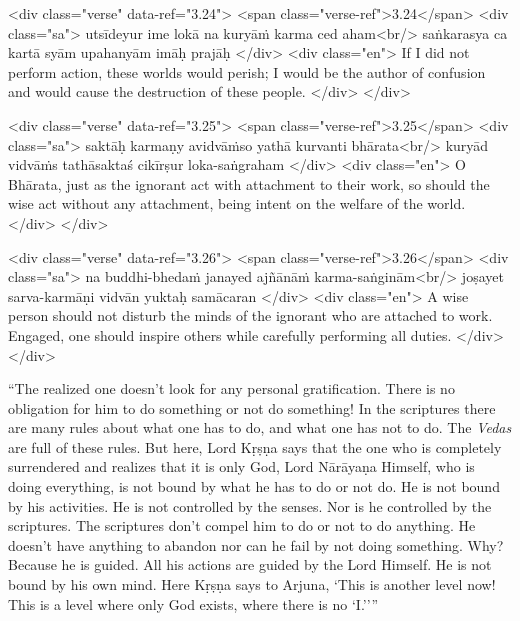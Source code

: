 \begin{html}
<div class="verse" data-ref="3.24">
  <span class="verse-ref">3.24</span>
  <div class="sa">
    utsīdeyur ime lokā na kuryāṁ karma ced aham<br/>
    saṅkarasya ca kartā syām upahanyām imāḥ prajāḥ
  </div>
  <div class="en">
    If I did not perform action, these worlds would perish; I would be the author of confusion and would cause the destruction of these people.
  </div>
</div>
\end{html}



\begin{html}
<div class="verse" data-ref="3.25">
  <span class="verse-ref">3.25</span>
  <div class="sa">
    saktāḥ karmaṇy avidvāṁso yathā kurvanti bhārata<br/>
    kuryād vidvāṁs tathāsaktaś cikīrṣur loka-saṅgraham
  </div>
  <div class="en">
    O Bhārata, just as the ignorant act with attachment to their work, so should the wise act without any attachment, being intent on the welfare of the world.
  </div>
</div>
\end{html}



\begin{html}
<div class="verse" data-ref="3.26">
  <span class="verse-ref">3.26</span>
  <div class="sa">
    na buddhi-bhedaṁ janayed ajñānāṁ karma-saṅginām<br/>
    joṣayet sarva-karmāṇi vidvān yuktaḥ samācaran
  </div>
  <div class="en">
    A wise person should not disturb the minds of the ignorant who are attached to work. Engaged, one should inspire others while carefully performing all duties.
  </div>
</div>
\end{html}


\enquote{The realized one doesn’t look for any personal gratification. There is no obligation for him to do something or not do something! In the scriptures there are many rules about what one has to do, and what one has not to do. The \textit{Vedas} are full of these rules. But here, Lord Kṛṣṇa says that the one who is completely surrendered and realizes that it is only God, Lord Nārāyaṇa Himself, who is doing everything, is not bound by what he has to do or not do. He is not bound by his activities. He is not controlled by the senses. Nor is he controlled by the scriptures. The scriptures don’t compel him to do or not to do anything. He doesn’t have anything to abandon nor can he fail by not doing something. Why? Because he is guided. All his actions are guided by the Lord Himself. He is not bound by his own mind. Here Kṛṣṇa says to Arjuna, \enquote{This is another level now! This is a level where only God exists, where there is no ‘I.’}}

